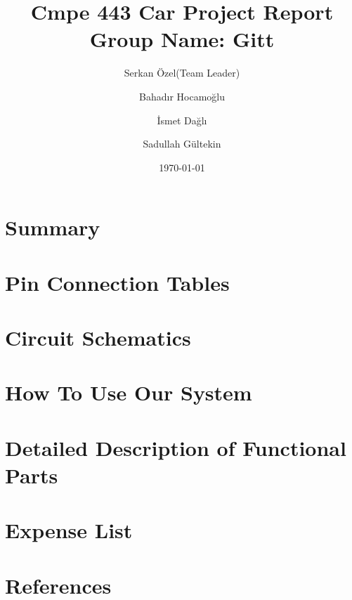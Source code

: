 \documentclass{article}
\author{\Large Serkan Özel(Team Leader) \and \Large Bahadır Hocamoğlu \and \Large İsmet Dağlı \and \Large Sadullah Gültekin}
\title{
\textbf{\Huge Cmpe 443 Car Project Report} \\
\huge Group Name: Gitt
}
\date{\Large \today}
\begin{document}
\maketitle
\newpage
\hypertarget{toc}{}
\tableofcontents
\newpage

\section{Summary}

\section{Pin Connection Tables}


\section{Circuit Schematics}

\section{How To Use Our System}

\section{Detailed Description of Functional Parts}

\section{Expense List}

\section{References}
\end{document}

